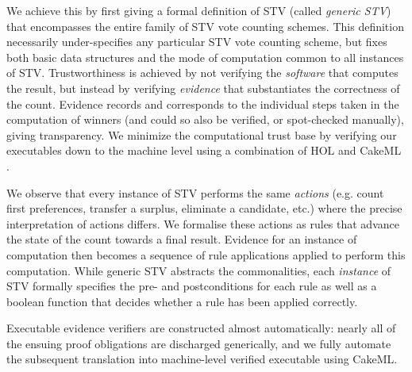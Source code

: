 \documentclass[10pt,conference]{IEEEtran}
\begin{document}

We achieve this by first giving a formal definition of STV (called \emph{generic STV}) 
that  encompasses the entire family of STV vote counting
schemes. This definition necessarily under-specifies any particular STV vote counting scheme, but fixes both basic data structures and the mode of computation common to all instances of STV. Trustworthiness is achieved by
not verifying the \emph{software} that computes the result, but instead by verifying \emph{evidence} that substantiates the correctness of the count. Evidence records and corresponds to the individual steps taken in the computation of winners 
(and could so also be verified, or spot-checked manually), giving transparency. We minimize the computational trust base by verifying our executables down to the machine level using a combination of HOL \cite{hol} and CakeML \cite{cake}. 

We observe that every instance of STV performs the same
\emph{actions} (e.g. count first preferences, transfer a surplus,
eliminate a candidate, etc.) where the precise interpretation of
actions differs. We formalise these actions as rules that advance the state of the count towards a final result. Evidence for an instance of computation then becomes a sequence of rule applications applied to perform this computation. While generic STV abstracts the commonalities, each \emph{instance} of STV formally specifies the
pre- and postconditions for each rule as well as a boolean function that decides whether a rule has been applied correctly. 

Executable evidence verifiers are constructed almost
automatically:  nearly all of the ensuing proof obligations are discharged generically, and we fully  automate the subsequent translation into machine-level verified executable using CakeML.
\end{document}
